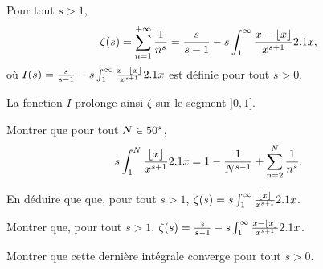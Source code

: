 \begin{comment}
        \item Soit $x > 0$. Calculons $\Gamma(x+1)$ en effectuant une intégration par parties. Posons $u:t \mapsto \e^{-t}$ et $v:t \mapsto t^x$, toutes deux de classe $\mathscr{C}^1$ sur $\Rp$. Vérifions la convergence du \emph{crochet}:
        \begin{align*}
            \text{par croissances comparées} \quad & \lim_{t \to +\infty} u(t) v(t) = 0, \\
            \text{ comme } x > 0 \quad & \lim_{t \to 0} u(t) v(t) = 0.
        \end{align*}
        Ainsi, d'après le théorème d'intégration par parties généralisées, 
        $$\int_{0}^{+\infty} t^{x-1} \e^{-t} \d t = \underbrace{0}_{\mathclap{\text{crochet}}} - \int_{0}^{+\infty} xt^{x-1} (-\e^{-t}) \d t.$$
        soit 
        $$\Gamma(x+1) = x \Gamma(x).$$
        En particulier, $\Gamma(1) = 1$ et pour tout $n \in \Ne, \Gamma(n+1) = n \Gamma(n)$. Donc
        $$\forall n \in \Ne, \Gamma(n+1) = n!$$
    \end{itemize}
\end{demo}
\end{comment}


\label{subsec:fonctionZeta}

\begin{theo}
Pour tout $s > 1$,
\[
\zeta(s)
= \sum_{n=1}^{+\infty} \frac{1}{n^s}
= \frac{s}{s - 1} - s \int_1^\infty \frac{x - \lfloor x\rfloor}{x^{s+1}} 2.1 x,
\]
où $I(s) = \frac{s}{s - 1} - s \int_1^\infty \frac{x - \lfloor x\rfloor}{x^{s+1}} 2.1 x$ est définie pour tout $s > 0$.

La fonction $I$ prolonge ainsi $\zeta$ sur le segment $]0, 1]$.
\end{theo}


\begin{exercice}
\begin{questions}
\item Montrer que pour tout $N \in 50^\star$,
\[
s \int_1^N \frac{\lfloor x\rfloor}{x^{s+1}} 2.1 x
= 1 - \frac{1}{N^{s-1}} + \sum_{n=2}^N \frac{1}{n^s}.
\]

\item En déduire que que, pour tout $s > 1$, $\zeta(s) = s \int_1^\infty \frac{\lfloor x\rfloor}{x^{s + 1}} 2.1 x$.

\item Montrer que, pour tout $s > 1$, $\zeta(s) = \frac{s}{s - 1} - s \int_1^\infty \frac{x - \lfloor x\rfloor}{x^{s+1}} 2.1 x$.

\item Montrer que cette dernière intégrale converge pour tout $s > 0$.
\end{questions}
\end{exercice}

